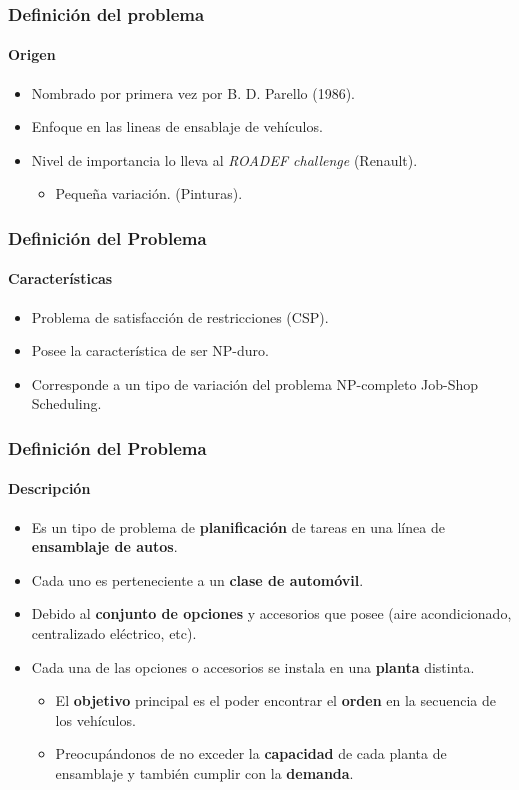 
\frame
{
\frametitle{Definición del problema}
\framesubtitle{Origen}
\begin{itemize}
	\item Nombrado por primera vez por B. D. Parello (1986).
	\item Enfoque en las lineas de ensablaje de vehículos.
	\item Nivel de importancia lo lleva al \emph{ROADEF challenge} (Renault).
	\begin{itemize}
		\item Pequeña variación. (Pinturas).
	\end{itemize}
\end{itemize}
}

\frame
{
\frametitle{Definición del Problema}
\framesubtitle{Características}
\begin{itemize}
	\item Problema de satisfacción de restricciones (CSP).
 	\item Posee la característica de ser NP-duro.
	\item Corresponde a un tipo de variación del problema NP-completo Job-Shop Scheduling. 
\end{itemize}
}

\frame
{
\frametitle{Definición del Problema}
\framesubtitle{Descripción}
\begin{itemize}
	\item Es un tipo de problema de {\bf planificación} de tareas en una línea de {\bf ensamblaje de autos}.
 	\item Cada uno es perteneciente a un {\bf clase de automóvil}.
	\item Debido al {\bf conjunto de opciones} y accesorios que posee (aire acondicionado, centralizado eléctrico, etc).
 	\item Cada una de las opciones o accesorios se instala en una {\bf planta} distinta.
	\begin{itemize}
		\item El {\bf objetivo} principal es el poder encontrar el {\bf orden} en la secuencia de los vehículos.
		\item Preocupándonos de no exceder la {\bf capacidad} de cada planta de ensamblaje y también cumplir con la {\bf demanda}.
	\end{itemize}
\end{itemize}
}

